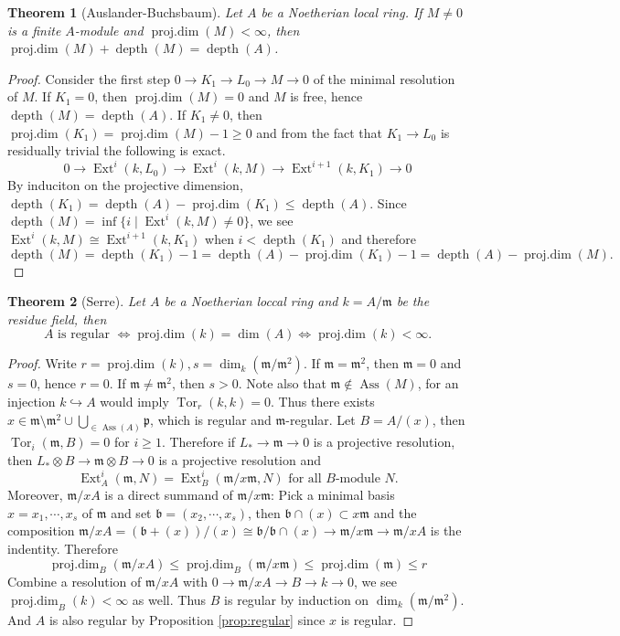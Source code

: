 \documentclass[leqno]{amsart}
\DeclareMathOperator{\Ass}{Ass}
\DeclareMathOperator{\depth}{depth}
\DeclareMathOperator{\prd}{proj.dim}
\newcommand{\1}{\mathbf{1}}
\newcommand{\fm}{\mathfrak m}
\newcommand{\fp}{\mathfrak p}
\DeclareMathOperator{\Ext}{Ext}
\DeclareMathOperator{\Tor}{Tor}
\newtheorem{thm}{Theorem}[section]
\theoremstyle{definition}
\theoremstyle{remark}
\begin{document}
\begin{thm}[Auslander-Buchsbaum]
	Let $A$ be a Noetherian local ring.
	If  $M\neq 0$ is a finite  $A$-module 
	and $\prd(M)<\infty$, then
	$\prd(M)+\depth(M)=\depth(A)$.
\end{thm}
\begin{proof}
	Consider the first step 
	$0\to K_1\to L_0\to M\to 0$
	of the minimal resolution of $M$.
	If $K_1=0$, then $\prd(M)=0$ and $M$ is free,
	hence $\depth(M)=\depth(A)$.
	If $K_1\neq 0$, then $\prd(K_1)=\prd(M)-1\geq 0$ and
	from the fact that $K_1\to L_0$ is residually trivial
	the following is exact.
	\[
		0\to \Ext^i(k,L_0)\to 
		\Ext^i(k,M)\to 
		\Ext^{i+1}(k,K_1)\to 0 
	\]
	By induciton on the projective dimension,
	$\depth(K_1)=\depth(A)-\prd(K_1)\leq \depth(A)$.
	Since $\depth(M)=\inf\{i\mid \Ext^i(k,M)\neq 0\}$,
	we see $\Ext^i(k,M)\cong \Ext^{i+1}(k,K_1)$ 
	when $i<\depth(K_1)$ and therefore
	\[
		\depth(M)=\depth(K_1)-1=\depth(A)-\prd(K_1)-1
		=\depth(A)-\prd(M).
	\]
\end{proof}

\begin{thm}[Serre]
	Let $A$ be a Noetherian loccal ring
	and $k=A/\fm$ be the residue field, then
	\[
		A \text{ is regular } \Longleftrightarrow
		\prd(k)=\dim(A) \Longleftrightarrow
		\prd(k)<\infty.
	\]
\end{thm}
\begin{proof}
	Write $r=\prd(k), s=\dim_k(\fm/\fm^2)$.
	If $\fm=\fm^2$, then $\fm=0$ and $s=0$, hence  $r=0$.
	If $\fm\neq \fm^2$, then  $s>0$.
	Note also that  $\fm\notin\Ass(M)$,
	for an injection $k\hookrightarrow A$ 
	would imply $\Tor_r(k,k)=0$.
	Thus there exists 
	$x\in \fm\setminus \fm^2\cup\bigcup_{\in \Ass(A)}\fp$,
	which is regular and $\fm$-regular.
	Let $B=A/(x)$, then
	$\Tor_i(\fm,B)=0$ for  $i\geq 1$.
	Therefore if $L_*\to \fm\to 0$ is a projective resolution,
	then  $L_*\otimes B\to \fm\otimes B\to 0$
	is a projective resolution and
	\[
		\Ext_A^i(\fm,N)=\Ext_B^i(\fm/x\fm, N) 
		\text{ for all $B$-module $N$.}
	\]
	Moreover, $\fm/xA$ is a direct summand of  $\fm/x\fm$:
	Pick a minimal basis $x=x_1,\cdots,x_s$ of $\fm$
	and set $\mathfrak{b}=(x_2,\cdots,x_s)$,
	then $\mathfrak{b}\cap (x)\subset x\fm$ and 
	the composition 
	$\fm/xA=(\mathfrak{b}+(x))/(x)\cong 
	\mathfrak{b}/\mathfrak{b}\cap (x)\to
	\fm/x\fm\to \fm/xA$ is the indentity.
	Therefore
	\[
		\prd_B(\fm/xA)\leq \prd_B(\fm/x\fm)
		\leq \prd(\fm)\leq r
	\]
	Combine a resolution of $\fm/xA$
	with $0\to \fm/xA\to B\to k\to 0$,
	we see $\prd_B(k)<\infty$ as well.
	Thus $B$ is regular by induction on 
	$\dim_k(\fm/\fm^2)$.
	And  $A$ is also regular by Proposition \ref{prop:regular}
	since $x$ is regular.
\end{proof}
\end{document}
